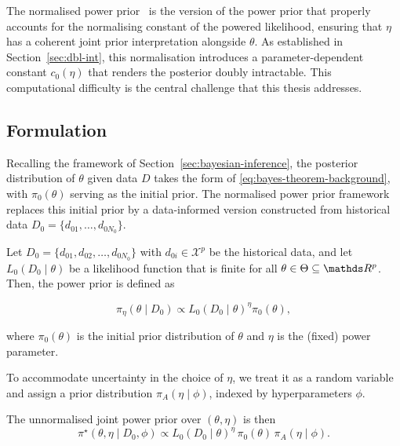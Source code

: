 The normalised power prior~\cite{duan2006, neuenschwander2009, carvalho2021} is the version of the power prior that properly accounts for the normalising constant of the powered likelihood, ensuring that $\eta$ has a coherent joint prior interpretation alongside $\theta$.
As established in Section~\ref{sec:dbl-int}, this normalisation introduces a parameter-dependent constant $c_0(\eta)$ that renders the posterior doubly intractable.
This computational difficulty is the central challenge that this thesis addresses.

\subsection{Formulation}

Recalling the framework of Section~\ref{sec:bayesian-inference}, the posterior distribution of $\theta$ given data $D$ takes the form of \eqref{eq:bayes-theorem-background}, with $\pi_0(\theta)$ serving as the initial prior.
The normalised power prior framework replaces this initial prior by a data-informed version constructed from historical data $D_0 = \{d_{01}, \ldots, d_{0N_0}\}$.


\begin{definition}
    Let $D_0 = \{d_{01}, d_{02}, \dots, d_{0N_0}\}$ with $d_{0i} \in \mathcal{X}^{p}$ be the historical data, and let $L_0(D_0 \mid \theta)$ be a likelihood function that is finite for all $\theta \in \Theta \subseteq \bR^p$. Then, the power prior is defined as

    \begin{equation}
        \label{eq:power-prior}
        \pi_\eta(\theta \mid D_0) \propto L_0(D_0 \mid \theta)^{\eta} \pi_0(\theta),
    \end{equation}

    where $\pi_0(\theta)$ is the initial prior distribution of $\theta$ and $\eta$ is the (fixed) power parameter.
\end{definition}

To accommodate uncertainty in the choice of $\eta$, we treat it as a random variable and assign a prior distribution $\pi_A(\eta \mid \phi)$, indexed by hyperparameters $\phi$.

The unnormalised joint power prior over $(\theta, \eta)$ is then
\begin{equation}
    \pi^\star(\theta, \eta \mid D_0, \phi)
    \propto
    L_0(D_0 \mid \theta)^{\eta}\, \pi_0(\theta)\, \pi_A(\eta \mid \phi).
\end{equation}

